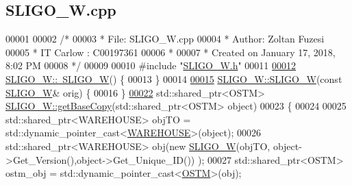 \hypertarget{_s_l_i_g_o___w_8cpp_source}{}\subsection{S\+L\+I\+G\+O\+\_\+\+W.\+cpp}

\begin{DoxyCode}
00001 
00002 \textcolor{comment}{/* }
00003 \textcolor{comment}{ * File:   SLIGO\_W.cpp}
00004 \textcolor{comment}{ * Author: Zoltan Fuzesi}
00005 \textcolor{comment}{ * IT Carlow : C00197361}
00006 \textcolor{comment}{ *}
00007 \textcolor{comment}{ * Created on January 17, 2018, 8:02 PM}
00008 \textcolor{comment}{ */}
00009 
00010 \textcolor{preprocessor}{#include "\hyperlink{_s_l_i_g_o___w_8h}{SLIGO\_W.h}"}
00011 
\hypertarget{_s_l_i_g_o___w_8cpp_source.tex_l00012}{}\hyperlink{class_s_l_i_g_o___w_aa6cc833af07309dee5eb2493cddf443c_aa6cc833af07309dee5eb2493cddf443c}{00012} \hyperlink{class_s_l_i_g_o___w_aa6cc833af07309dee5eb2493cddf443c_aa6cc833af07309dee5eb2493cddf443c}{SLIGO\_W::~SLIGO\_W}() \{
00013 \}
00014 
\hypertarget{_s_l_i_g_o___w_8cpp_source.tex_l00015}{}\hyperlink{class_s_l_i_g_o___w_abd92acb0451fe449fbdb7c3c2a6701b7_abd92acb0451fe449fbdb7c3c2a6701b7}{00015} \hyperlink{class_s_l_i_g_o___w_a9b669809dc7cf8d9982181ac7997b0da_a9b669809dc7cf8d9982181ac7997b0da}{SLIGO\_W::SLIGO\_W}(\textcolor{keyword}{const} \hyperlink{class_s_l_i_g_o___w}{SLIGO\_W}& orig) \{
00016 \}
\hypertarget{_s_l_i_g_o___w_8cpp_source.tex_l00022}{}\hyperlink{class_s_l_i_g_o___w_a37ead49afd27bfe7e404d1d7626f09fe_a37ead49afd27bfe7e404d1d7626f09fe}{00022} std::shared\_ptr<OSTM> \hyperlink{class_s_l_i_g_o___w_a37ead49afd27bfe7e404d1d7626f09fe_a37ead49afd27bfe7e404d1d7626f09fe}{SLIGO\_W::getBaseCopy}(std::shared\_ptr<OSTM> \textcolor{keywordtype}{object})
00023 \{
00024 
00025     std::shared\_ptr<WAREHOUSE> objTO = std::dynamic\_pointer\_cast<\hyperlink{class_w_a_r_e_h_o_u_s_e}{WAREHOUSE}>(object);
00026     std::shared\_ptr<WAREHOUSE> obj(\textcolor{keyword}{new} \hyperlink{class_s_l_i_g_o___w_a9b669809dc7cf8d9982181ac7997b0da_a9b669809dc7cf8d9982181ac7997b0da}{SLIGO\_W}(objTO, object->Get\_Version(),\textcolor{keywordtype}{object}->Get\_Unique\_ID())
      );
00027     std::shared\_ptr<OSTM> ostm\_obj = std::dynamic\_pointer\_cast<\hyperlink{class_o_s_t_m}{OSTM}>(obj);                             
           

\end{DoxyCode}
